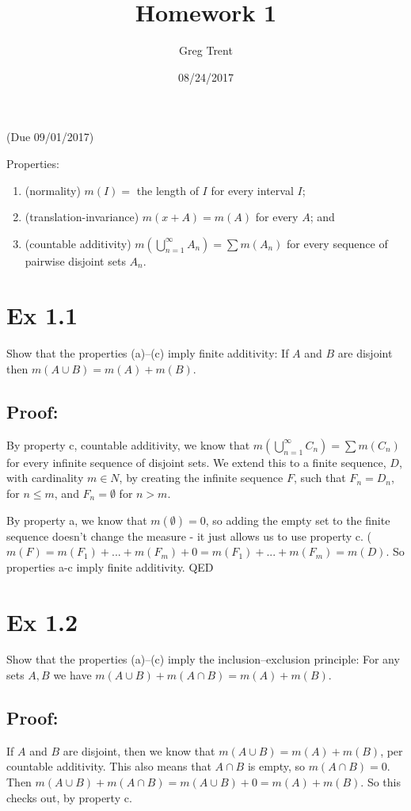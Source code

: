 \documentclass{article}
\author{Greg Trent}
\title{Homework 1}
\date{08/24/2017}
\begin{document}
\maketitle
(Due 09/01/2017)

Properties:
\begin{enumerate}
\item (normality) $m(I)=$ the length of $I$ for every interval $I$;
\item (translation-invariance) $m(x+A)=m(A)$ for every $A$; and
\item (countable additivity) $m(\bigcup_{n=1}^{\infty} A_n)=\sum m(A_n)$ for every sequence of pairwise disjoint sets $A_n$.
\end{enumerate}

\section{Ex 1.1}
  Show that the properties (a)--(c) imply finite additivity: If $A$ and $B$ are disjoint then $m(A\cup B)=m(A)+m(B)$.

\subsection{Proof:}
By property c, countable additivity, we know that $m(\bigcup_{n=1}^{\infty} C_n)=\sum m(C_n)$ for every infinite sequence of disjoint sets. We extend this to a finite sequence, $D$, with cardinality $m \in N$, by creating the infinite sequence $F$, such that $F_n = D_n$, for $n \leq m$, and $F_n = \emptyset$ for $n > m$.

By property a, we know that $m(\emptyset) = 0$, so adding the empty set to the finite sequence doesn't change the measure - it just allows us to use property c. ($m(F) = m(F_1) + ... + m(F_m) + 0 = m(F_1) + ... + m(F_m) = m(D)$. So properties a-c imply finite additivity. QED

\section{Ex 1.2}
  Show that the properties (a)--(c) imply the inclusion--exclusion principle: For any sets $A,B$ we have $m(A\cup B)+m(A\cap B)=m(A)+m(B)$.

\subsection{Proof:}
If $A$ and $B$ are disjoint, then we know that $m(A \cup B) = m(A) + m(B)$, per countable additivity. This also means that $A \cap B$ is empty, so $m(A \cap B) = 0$. Then $m(A \cup B) + m(A \cap B) = m(A \cup B) + 0 = m(A) + m(B)$. So this checks out, by property c.  
\end{document}
